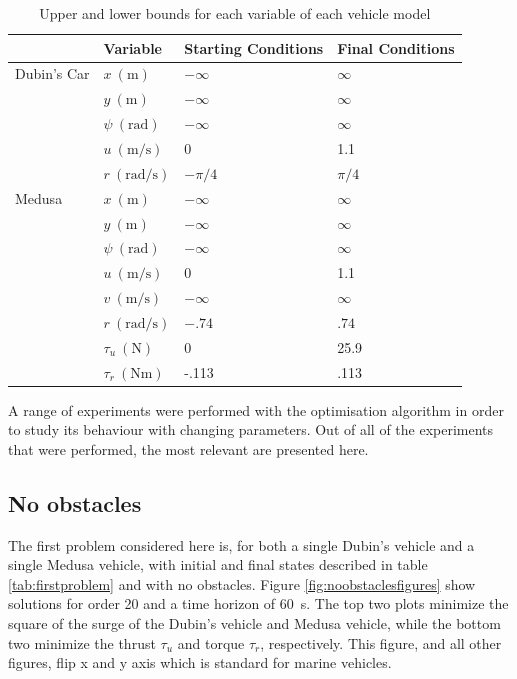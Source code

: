 \begin{table}[h!]
\centering
\begin{tabular}{|l|l|l|l|}
\hline
& Variable & Starting Conditions & Final Conditions \\ \hline
Dubin's Car & $x\ (\si{\meter})$ & $-\infty$ & $\infty$ \\
& $y\ (\si{\meter})$ & $-\infty$ & $\infty$ \\
& $\psi\ (\si{\radian})$ & $-\infty$ & $\infty$ \\
& $u\ (\si{\meter\per\second})$ & 0 & 1.1 \\
& $r\ (\si{\radian\per\second})$ & $-\pi/4$ & $\pi/4$ \\ \hline
Medusa & $x\ (\si{\meter})$ & $-\infty$ & $\infty$ \\
& $y\ (\si{\meter})$ & $-\infty$ & $\infty$ \\
& $\psi\ (\si{\radian})$ & $-\infty$ & $\infty$ \\
& $u\ (\si{\meter\per\second})$ & 0 & 1.1 \\
& $v\ (\si{\meter\per\second})$ & $-\infty$ & $\infty$ \\
& $r\ (\si{\radian\per\second})$ & $-.74$ & $.74$ \\
& $\tau_u\ (\si{\newton})$ & 0 & 25.9 \\
& $\tau_r\ (\si{\newton\meter})$ & -.113 & .113 \\
\hline
\end{tabular}
\caption{Upper and lower bounds for each variable of each vehicle model}
\label{tab:variablebounds}
\end{table}

\par A range of experiments were performed with the optimisation algorithm in order to study its behaviour with changing parameters. Out of all of the experiments that were performed, the most relevant are presented here.


\subsection{No obstacles}

\par The first problem considered here is, for both a single Dubin's vehicle and a single Medusa vehicle, with initial and final states described in table \ref{tab:firstproblem} and with no obstacles. Figure \ref{fig:noobstaclesfigures} show solutions for order 20 and a time horizon of \SI{60}{\second}. The top two plots minimize the square of the surge of the Dubin's vehicle and Medusa vehicle, while the bottom two minimize the thrust $\tau_u$ and torque $\tau_r$, respectively. This figure, and all other figures, flip x and y axis which is standard for marine vehicles.

